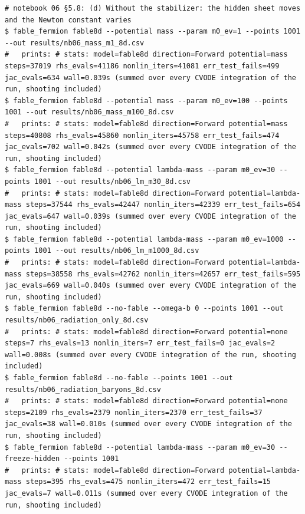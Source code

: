 \begin{Verbatim}
# notebook 06 §5.8: (d) Without the stabilizer: the hidden sheet moves and the Newton constant varies
$ fable_fermion fable8d --potential mass --param m0_ev=1 --points 1001 --out results/nb06_mass_m1_8d.csv
#   prints: # stats: model=fable8d direction=Forward potential=mass steps=37019 rhs_evals=41186 nonlin_iters=41081 err_test_fails=499 jac_evals=634 wall=0.039s (summed over every CVODE integration of the run, shooting included)
$ fable_fermion fable8d --potential mass --param m0_ev=100 --points 1001 --out results/nb06_mass_m100_8d.csv
#   prints: # stats: model=fable8d direction=Forward potential=mass steps=40808 rhs_evals=45860 nonlin_iters=45758 err_test_fails=474 jac_evals=702 wall=0.042s (summed over every CVODE integration of the run, shooting included)
$ fable_fermion fable8d --potential lambda-mass --param m0_ev=30 --points 1001 --out results/nb06_lm_m30_8d.csv
#   prints: # stats: model=fable8d direction=Forward potential=lambda-mass steps=37544 rhs_evals=42447 nonlin_iters=42339 err_test_fails=654 jac_evals=647 wall=0.039s (summed over every CVODE integration of the run, shooting included)
$ fable_fermion fable8d --potential lambda-mass --param m0_ev=1000 --points 1001 --out results/nb06_lm_m1000_8d.csv
#   prints: # stats: model=fable8d direction=Forward potential=lambda-mass steps=38558 rhs_evals=42762 nonlin_iters=42657 err_test_fails=595 jac_evals=669 wall=0.040s (summed over every CVODE integration of the run, shooting included)
$ fable_fermion fable8d --no-fable --omega-b 0 --points 1001 --out results/nb06_radiation_only_8d.csv
#   prints: # stats: model=fable8d direction=Forward potential=none steps=7 rhs_evals=13 nonlin_iters=7 err_test_fails=0 jac_evals=2 wall=0.008s (summed over every CVODE integration of the run, shooting included)
$ fable_fermion fable8d --no-fable --points 1001 --out results/nb06_radiation_baryons_8d.csv
#   prints: # stats: model=fable8d direction=Forward potential=none steps=2109 rhs_evals=2379 nonlin_iters=2370 err_test_fails=37 jac_evals=38 wall=0.010s (summed over every CVODE integration of the run, shooting included)
$ fable_fermion fable8d --potential lambda-mass --param m0_ev=30 --freeze-hidden --points 1001
#   prints: # stats: model=fable8d direction=Forward potential=lambda-mass steps=395 rhs_evals=475 nonlin_iters=472 err_test_fails=15 jac_evals=7 wall=0.011s (summed over every CVODE integration of the run, shooting included)


\end{Verbatim}
